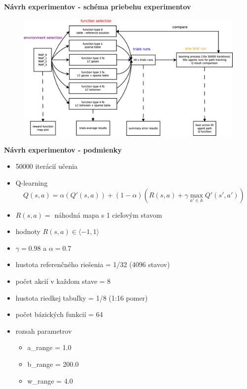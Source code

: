 \documentclass[xcolor=dvipsnames]{beamer}
\begin{document}
\begin{frame}{\bf Návrh experimentov - schéma priebehu experimentov}

\begin{figure}[!htb]
\centering
\includegraphics[scale=.22]{../diagrams/experiment_map_q_learning.eps}
\end{figure}

\end{frame}





\begin{frame}{\bf Návrh experimentov - podmienky}

\begin{itemize}
\item 50000 iterácií učenia
\item Q-learning
\begin{equation} \label{eu_eqn}
Q(s,a) = \alpha(Q'(s,a)) + (1 - \alpha)(R(s,a) + \gamma \max_{a' \in \mathbb{A}} Q'(s', a')) \nonumber
\end{equation}

\item $R(s, a) =$ náhodná mapa s 1 cieľovým stavom
\item hodnoty $R(s, a) \in \langle -1, 1 \rangle$
\item $\gamma = 0.98$ a $\alpha = 0.7$

\item hustota referenčného riešenia = 1/32  (4096 stavov)
\item počet akcií v každom stave = 8
\item hustota riedkej tabuľky = 1/8  (1:16 pomer)
\item počet bázických funkcií = 64
\item rozsah parametrov
    \begin{itemize}
      \item a\_range = 1.0
      \item b\_range = 200.0
      \item w\_range = 4.0
    \end{itemize}
\end{itemize}

\end{frame}
\end{document}
